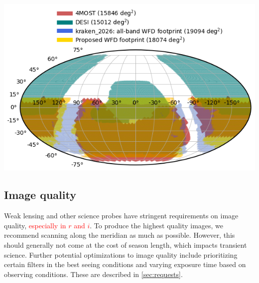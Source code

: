 \documentclass[12pt, letterpaper]{article}
\newcommand{\review}[1]{{\textcolor{red}{#1}}}
\begin{document}
\begin{minipage}{\columnwidth}
\centering
\includegraphics[width=0.8\columnwidth]{wfdfootprint_proposed_vs_kraken_2026_vs_4most_desi_nside256_matplotlib.png}
   \label{fig:footprint}
\end{minipage}

\subsection{Image quality}
\label{sec:image_quality}
Weak lensing and other science probes have stringent requirements on image quality, \review{especially in $r$ and $i$}. To produce the highest quality images, we recommend scanning along the meridian as 
much 
as possible. However, this should generally not come at the cost of season length, which impacts transient science. Further potential optimizations to image quality include prioritizing certain filters in the best seeing conditions and varying exposure time based on observing conditions. These are described in \autoref{sec:requests}.
\end{document}
